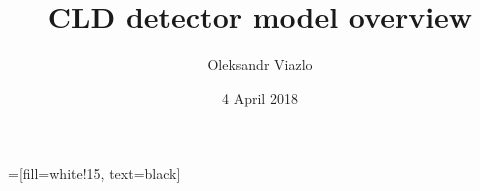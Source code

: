 \documentclass[8pt]{beamer}
\newif\ifplacelogo %
\begin{document}
\newcommand{\backupbegin}{
   \newcounter{finalframe}
   \setcounter{finalframe}{\value{framenumber}}
}
\newcommand{\backupend}{
   \setcounter{framenumber}{\value{finalframe}}
}

\newcommand{\myNode}{\tikz[baseline,inner sep=1pt] \node[anchor=base]}

 =[fill=white!15, text=black]



\title[ CLD detector model overview \hspace{13.5em}\insertframenumber/
\inserttotalframenumber]{ CLD detector model overview}


	\author[Oleksandr Viazlo]{Oleksandr Viazlo \\ 
	}
	
       
	\date{4 April 2018}


	
   	\frame{\titlepage}

   	

\placelogofalse
\end{document}
